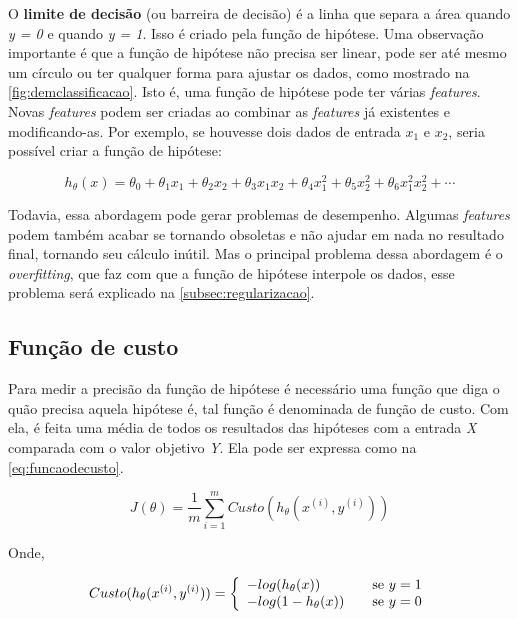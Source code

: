 O \textbf{limite de decisão} (ou barreira de decisão) é a linha que separa a área quando \textit{y = 0} e quando \textit{y = 1}. Isso é criado pela função de hipótese. Uma observação importante é que a função de hipótese não precisa ser linear, pode ser até mesmo um círculo ou ter qualquer forma para ajustar os dados, como mostrado na \autoref{fig:demclassificacao}. Isto é, uma função de hipótese pode ter várias \textit{features}. Novas \textit{features} podem ser criadas ao combinar as \textit{features} já existentes e modificando-as. Por exemplo, se houvesse dois dados de entrada $x_1$ e $x_2$, seria possível criar a função de hipótese:

\begin{equation}
\nonumber
h_{\theta}(x) = \theta_0 + \theta_1 x_1 + \theta_2 x_2 + \theta_3 x_1 x_2 + \theta_4 x_1^2 + \theta_5 x_2^2 + \theta_6 x_1^2 x_2^2 + \cdots
\end{equation}

Todavia, essa abordagem pode gerar problemas de desempenho. Algumas \textit{features} podem também acabar se tornando obsoletas e não ajudar em nada no resultado final, tornando seu cálculo inútil. Mas o principal problema dessa abordagem é o \textit{overfitting}, que faz com que a função de hipótese interpole os dados, esse problema será explicado na \autoref{subsec:regularizacao}.


\subsection{Função de custo}

Para medir a precisão da função de hipótese é necessário uma função que diga o quão precisa aquela hipótese é, tal função é denominada de função de custo. Com ela, é feita uma média de todos os resultados das hipóteses com a entrada \textit{X} comparada com o valor objetivo \textit{Y}. Ela pode ser expressa como na \autoref{eq:funcaodecusto}.

\begin{equation}
\label{eq:funcaodecusto}
J(\theta) = \frac{1}{m}\sum\limits_{i=1}^{m}Custo(h_{\theta}(x^{(i)}, y^{(i)}))
\end{equation}

Onde,


\begin{align}
 Custo(h_{\theta}(x^{(i)}, y^{(i)})) = \left\{
  \begin{array}{l l} 
    -log(h_{\theta}(x)) & \quad \text{se } y=1 \\
    -log(1 - h_{\theta}(x)) & \quad \text{se } y=0 \label{eq:funcaocusto}
  \end{array} \right.
\end{align}


